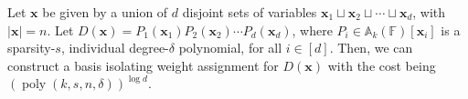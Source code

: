 \documentclass[final,oneeqnum, onethmnum, onefignum]{siamltex1213}
\newcommand{\N}{\mathbb N}
\newcommand{\A}{\mathbb A}
\newcommand{\F}{\mathbb F}
\newcommand{\abs}[1]{\lvert #1 \rvert}
\newcommand{\M}{\mathcal M}
\newcommand{\degree}{\delta} %
\DeclareMathOperator{\Span}{span}
\DeclareMathOperator{\poly}{poly}
\begin{document}
\begin{lemma}
\label{lem:weightFunction}
Let $\mathbf{x}$ be given by a union of $d$ disjoint sets of variables
${\mathbf x}_1 \sqcup {\mathbf x}_2 \sqcup \dotsm \sqcup {\mathbf x}_d$, 
with $\abs{\mathbf{x}} = n$. 
Let $D({\mathbf x}) = P_1({\mathbf x}_1) P_2({\mathbf x}_2) \dotsm P_d({\mathbf x}_d)$,
where $P_i \in \A_k(\F)[{\mathbf x}_i]$ is a sparsity-$s$, 
individual degree-$\degree$ polynomial, for all $i \in [d]$. 
Then, we can construct a basis isolating weight assignment 
for $D(\mathbf{x})$ 
 with the cost being $(\poly(k, s, n, \degree))^{\log d}$.
\end{lemma}
\end{document}
